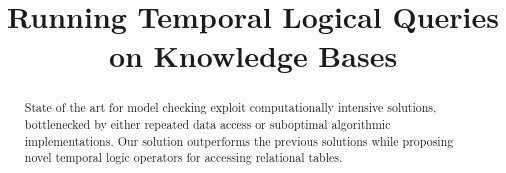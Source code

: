 \documentclass[11pt]{article}
\begin{document}
\title{Running Temporal Logical Queries on Knowledge Bases}
\author{\vspace{-10ex}}
\date{\vspace{-10ex}}

\maketitle
~\\
\begin{abstract}
State of the art for model checking exploit computationally intensive solutions, bottlenecked by either repeated data access or suboptimal algorithmic implementations. Our solution outperforms the previous solutions while proposing novel temporal logic operators for accessing relational tables.	


\end{abstract}
\end{document}
